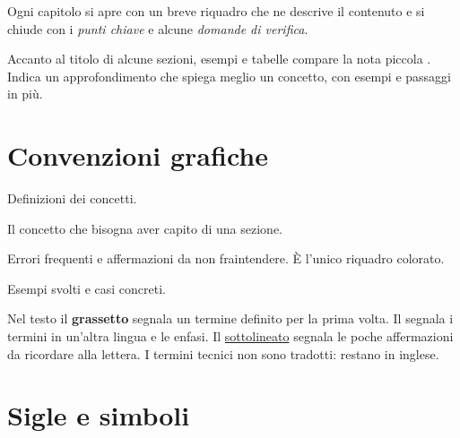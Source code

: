Ogni capitolo si apre con un breve riquadro che ne descrive il contenuto e si chiude con i \emph{punti chiave}
e alcune \emph{domande di verifica}.

Accanto al titolo di alcune sezioni, esempi e tabelle compare la nota piccola \aggiunta. Indica un approfondimento
che spiega meglio un concetto, con esempi e passaggi in più.

\section*{Convenzioni grafiche}

\begin{definizione}[nome]
Definizioni dei concetti.
\end{definizione}
\begin{idea}
Il concetto che bisogna aver capito di una sezione.
\end{idea}
\begin{attenzione}
Errori frequenti e affermazioni da non fraintendere. È l'unico riquadro colorato.
\end{attenzione}
\begin{esempio}
Esempi svolti e casi concreti.
\end{esempio}

Nel testo il \textbf{grassetto} segnala un termine definito per la prima volta. Il  segnala i termini
in un'altra lingua e le enfasi. Il \uline{sottolineato} segnala le poche affermazioni da ricordare alla lettera.
I termini tecnici non sono tradotti: restano in inglese.

\section*{Sigle e simboli}

